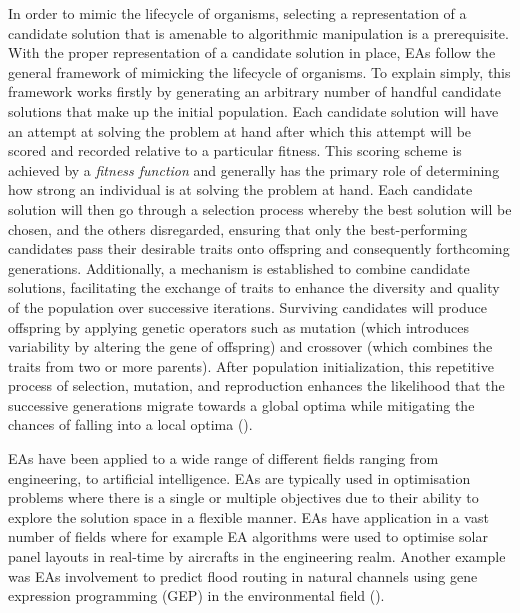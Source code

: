 \parbreak\noindent In order to mimic the lifecycle of organisms, selecting a representation of a candidate solution that is amenable to algorithmic manipulation is a prerequisite. With the proper representation of a candidate solution in place, EAs follow the general framework of mimicking the lifecycle of organisms. To explain simply, this framework works firstly by generating an arbitrary number of handful candidate solutions that make up the initial population. Each candidate solution will have an attempt at solving the problem at hand after which this attempt will be scored and recorded relative to a particular fitness. This scoring scheme is achieved by a \textit{fitness function} and generally has the primary role of determining how strong an individual is at solving the problem at hand. Each candidate solution will then go through a selection process whereby the best solution will be chosen, and the others disregarded, ensuring that only the best-performing candidates pass their desirable traits onto offspring and consequently forthcoming generations. Additionally, a mechanism is established to combine candidate solutions, facilitating the exchange of traits to enhance the diversity and quality of the population over successive iterations. Surviving candidates will produce offspring by applying genetic operators such as mutation (which introduces variability by altering the gene of offspring) and crossover (which combines the traits from two or more parents). After population initialization, this repetitive process of selection, mutation, and reproduction enhances the likelihood that the successive generations migrate towards a global optima while mitigating the chances of falling into a local optima (\cite{evolutionaryComputingAndNeuralNetworks}). 

\parbreak\noindent EAs have been applied to a wide range of different fields ranging from engineering, to artificial intelligence. EAs are typically used in optimisation problems where there is a single or multiple objectives due to their ability to explore the solution space in a flexible manner. EAs have application in a vast number of fields where for example EA algorithms were used to optimise solar panel layouts in real-time by aircrafts in the engineering realm. Another example was EAs involvement to predict flood routing in natural channels using gene expression programming (GEP) in the environmental field (\cite{slowik2020evolutionary}).

